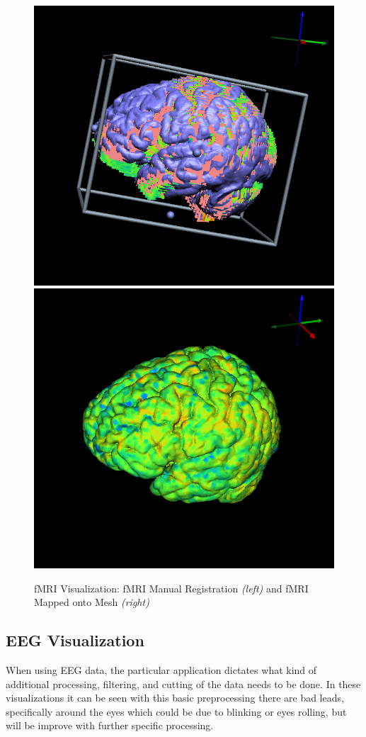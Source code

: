 \begin{figure}[H]
\begin{center}
\includegraphics[width=.49\textwidth]{Figures/fmri_reg}
\includegraphics[width=.49\textwidth]{Figures/fmri_1}
\caption{fMRI Visualization: fMRI Manual Registration \textit{(left)} and fMRI Mapped onto Mesh \textit{(right)}}
\label{fig:fmrivis}
\end{center}
\end{figure}

\subsection{EEG Visualization}

When using EEG data, the particular application dictates what kind of additional processing, filtering, and cutting of the data needs to be done. In these visualizations it can be seen with this basic preprocessing there are bad leads, specifically around the eyes which could be due to blinking or eyes rolling, but will be improve with further specific processing.

